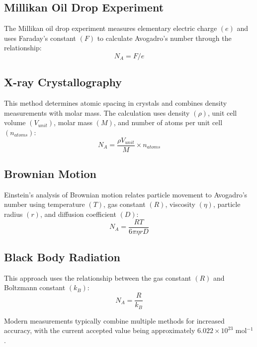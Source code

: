 \documentclass[
  a4paper,
]{book}
\begin{document}
\begin{tcolorbox}[enhanced jigsaw, coltitle=black, title=\textcolor{quarto-callout-note-color}{\faInfo}\hspace{0.5em}{Other Experimental Methods for Determining Avogadro's Number}, colframe=quarto-callout-note-color-frame, toprule=.15mm, opacitybacktitle=0.6, left=2mm, opacityback=0, breakable, toptitle=1mm, bottomtitle=1mm, leftrule=.75mm, arc=.35mm, titlerule=0mm, colbacktitle=quarto-callout-note-color!10!white, rightrule=.15mm, bottomrule=.15mm, colback=white]

\subsection{Millikan Oil Drop
Experiment}\label{millikan-oil-drop-experiment}

The Millikan oil drop experiment measures elementary electric charge
\((e)\) and uses Faraday's constant \((F)\) to calculate Avogadro's
number through the relationship: \[N_A = F/e\]

\subsection{X-ray Crystallography}\label{x-ray-crystallography}

This method determines atomic spacing in crystals and combines density
measurements with molar mass. The calculation uses density \((\rho)\),
unit cell volume \((V_{unit})\), molar mass \((M)\), and number of atoms
per unit cell \((n_{atoms})\):
\[N_A = \frac{\rho V_{unit}}{M} \times n_{atoms}\]

\subsection{Brownian Motion}\label{brownian-motion}

Einstein's analysis of Brownian motion relates particle movement to
Avogadro's number using temperature \((T)\), gas constant \((R)\),
viscosity \((\eta)\), particle radius \((r)\), and diffusion coefficient
\((D)\): \[N_A = \frac{RT}{6\pi\eta rD}\]

\subsection{Black Body Radiation}\label{black-body-radiation}

This approach uses the relationship between the gas constant \((R)\) and
Boltzmann constant \((k_B)\): \[N_A = \frac{R}{k_B}\]

Modern measurements typically combine multiple methods for increased
accuracy, with the current accepted value being approximately
\(6.022 \times 10^{23}\) mol\(^{-1}\).

\end{tcolorbox}
\end{document}
